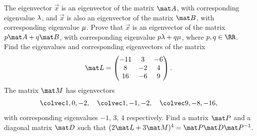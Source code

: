 \begin{problem}
    The eigenvector $\vec x$ is an eigenvector of the matrix $\mat A$, with corresponding eigenvalue $\lambda$, and $\vec x$ is also an eigenvector of the matrix $\mat B$, with corresponding eigenvalue $\mu$. Prove that $\vec x$ is an eigenvector of the matrix $p\mat A + q \mat B$, with corresponding eigenvalue $p \lambda + q \mu$, where $p, q \in \RR$. Find the eigenvalues and corresponding eigenvectors of the matrix \[\mat L = \begin{pmatrix}-11 & 3 & -6 \\ 8 & -2 & 4 \\ 16 & -6 & 9\end{pmatrix}.\] The matrix $\mat M$ has eigenvectors \[\cveciii10{-2}, \quad \cveciii1{-1}{-2}, \quad \cveciii9{-8}{-16},\] with corresponding eigenvalues $-1$, 3, 4 respectively. Find a matrix $\mat P$ and a diagonal matrix $\mat D$ such that $(2\mat L + 3\mat M)^4 = \mat P \mat D \mat P^{-1}$.
\end{problem}
